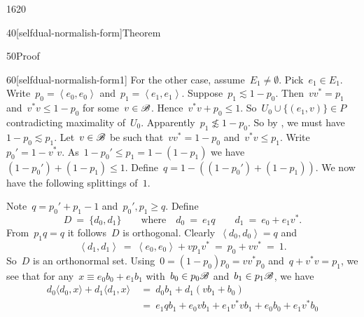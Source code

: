 \begin{parsec}{1620}
\begin{point}{40}[selfdual-normalish-form]{Theorem}
\begin{point}{50}{Proof}
\begin{point}{60}[selfdual-normalish-form1]
For the other case, assume~$E_1 \neq \emptyset$.
Pick~$e_1 \in E_1$.
Write~$p_0 = \left<e_0,e_0\right>$
    and~$p_1 = \left<e_1,e_1\right>$.
Suppose~$p_1 \lesssim 1 - p_0$.
Then~$vv^* = p_1$ and~$v^*v \leq 1- p_0$ for some~$v \in \mathscr{B}$.
    Hence~$v^*v + p_0 \leq 1$.
    So~$U_0 \cup \{ (e_1, v) \} \in P$ contradicting maximality of~$U_0$.
Apparently~$p_1 \not\lesssim 1-p_0$.
So by , we must have~$1-p_0 \lesssim p_1$.
Let~$v \in \mathscr{B}$ be such that~$vv^*=1-p_0$
    and~$v^*v \leq p_1$.
Write~$p_0' = 1- v^*v$.
As~$1-p_0' \leq p_1 =1-(1-p_1)$
we have~$(1-p_0') + (1-p_1) \leq 1$.
Define~$q = 1- ((1-p_0') + (1-p_1))$.
We now have the following splittings of~$1$.
\begin{center}
\end{center}
Note~$q = p_0'+p_1 - 1$ and~$p_0', p_1 \geq q$.
Define
\begin{equation*}
    D \ = \ \{d_0, d_1\} \qquad \text{where} \quad
    d_0 \ =\   e_1 q \qquad
    d_1 \ = \ e_0 + e_1v^*.
\end{equation*}
From~$p_1q=q$ it follows~$D$ is orthogonal.
Clearly~$\left<d_0,d_0\right>=q$ and
\begin{equation*}
    \left<d_1, d_1\right>
        \ =\ \left<e_0, e_0\right> + vp_1v^*    
        \ =\ p_0 + vv^* \ =\ 1.
\end{equation*}
So~$D$ is an orthonormal set.
Using~$0 = (1-p_0)p_0 = vv^*p_0 $ and~$q+v^*v = p_1$, we see
that for any~$x \equiv e_0 b_0 + e_1 b_1$
with~$b_0 \in p_0\mathscr{B}$ and~$b_1 \in p_1 \mathscr{B}$, we have
\begin{align*}
    d_0 \langle d_0, x \rangle + d_1 \langle d_1 , x \rangle
    &\ = \ d_0 b_1 + d_1(vb_1 + b_0) \\
    &\ = \ e_1 q b_1 + e_0 vb_1 + e_1v^*vb_1 + e_0 b_0 + e_1v^* b_0 \\

\end{align*}
\end{point}
\end{point}
\end{point}
\end{parsec}
